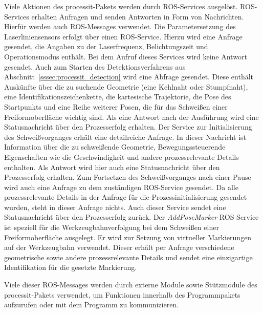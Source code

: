 Viele Aktionen des processit-Pakets werden durch ROS-Services ausgelöst. ROS-Services erhalten Anfragen und senden Antworten in Form von Nachrichten. Hierfür werden auch ROS-Messages verwendet. Die Parametersetzung des Laserliniensensors erfolgt über einen ROS-Service. Hierzu wird eine Anfrage gesendet, die Angaben zu der Laserfrequenz, Belichtungszeit und Operationsmodus enthält. Bei dem Aufruf dieses Services wird keine Antwort gesendet. Auch zum Starten des Detektionsverfahrens aus Abschnitt~\ref{sssec:processit_detection} wird eine Abfrage gesendet. Diese enthält Auskünfte über die zu suchende Geometrie (eine Kehlnaht oder Stumpfnaht), eine Identifikationszeichenkette, die kartesische Trajektorie, die Pose des Startpunkts und eine Reihe weiterer Posen, die für das Schweißen einer Freiformoberfläche wichtig sind. Als eine Antwort nach der Ausführung wird eine Statusnachricht über den Prozesserfolg erhalten. Der Service zur Initialisierung des Schweißvorganges erhält eine detailreiche Anfrage. In dieser Nachricht ist Information über die zu schweißende Geometrie, Bewegungssteuerende Eigenschaften wie die Geschwindigkeit und andere prozessrelevante Details enthalten. Als Antwort wird hier auch eine Statusnachricht über den Prozesserfolg erhalten. Zum Fortsetzen des Schweißvorganges nach einer Pause wird auch eine Anfrage zu dem zuständigen ROS-Service gesendet. Da alle prozessrelevante Details in der Anfrage für die Prozessinitialisierung gesendet wurden, steht in dieser Anfrage nichts. Auch dieser Service sendet eine Statusnachricht über den Prozesserfolg zurück. Der \emph{AddPoseMarker} ROS-Service ist speziell für die Werkzeugbahnverfolgung bei dem Schweißen einer Freiformoberfläche ausgelegt. Er wird zur Setzung von virtueller Markierungen auf der Werkzeugbahn verwendet. Dieser erhält per Anfrage verschiedene geometrische sowie andere prozessrelevante Details und sendet eine einzigartige Identifikation für die gesetzte Markierung. 

Viele dieser ROS-Messages werden durch externe Module sowie Stützmodule des processit-Pakets verwendet, um Funktionen innerhalb des Programmpakets aufzurufen oder mit dem Programm zu kommunizieren.

